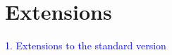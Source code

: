 \section{Extensions} \label{sec:extensions}
\textcolor{blue}{1. Extensions to the standard version}





